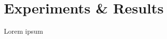 \documentclass[../main.tex]{subfiles}
\begin{document}
\chapter{Experiments \& Results}

Lorem ipsum
\end{document}
